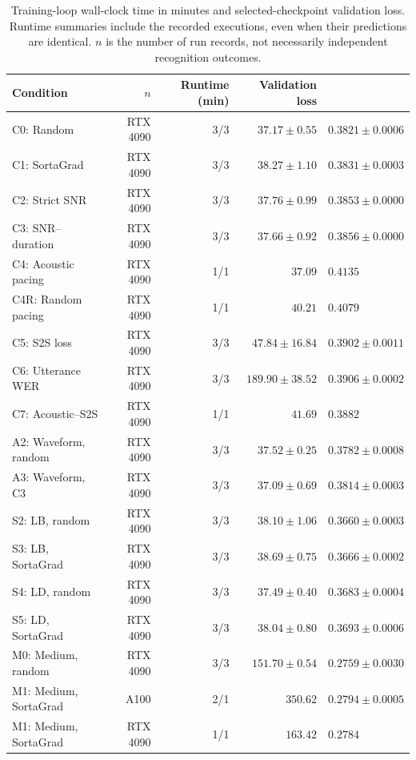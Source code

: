 \documentclass[12pt,a4paper]{report}
\begin{document}
\begin{table}[htbp]\centering\small
\caption{Training-loop wall-clock time in minutes and selected-checkpoint validation loss. Runtime summaries include the recorded executions, even when their predictions are identical. $n$ is the number of run records, not necessarily independent recognition outcomes.}\label{tab:results-resources}
\begin{tabular}{lrrr}\toprule
Condition & $n$ & Runtime (min) & Validation loss\\\midrule
C0: Random & RTX 4090 & 3/3 & $37.17 \pm 0.55$ & $0.3821 \pm 0.0006$ \\
C1: SortaGrad & RTX 4090 & 3/3 & $38.27 \pm 1.10$ & $0.3831 \pm 0.0003$ \\
C2: Strict SNR & RTX 4090 & 3/3 & $37.76 \pm 0.99$ & $0.3853 \pm 0.0000$ \\
C3: SNR--duration & RTX 4090 & 3/3 & $37.66 \pm 0.92$ & $0.3856 \pm 0.0000$ \\
C4: Acoustic pacing & RTX 4090 & 1/1 & $37.09$ & $0.4135$ \\
C4R: Random pacing & RTX 4090 & 1/1 & $40.21$ & $0.4079$ \\
C5: S2S loss & RTX 4090 & 3/3 & $47.84 \pm 16.84$ & $0.3902 \pm 0.0011$ \\
C6: Utterance WER & RTX 4090 & 3/3 & $189.90 \pm 38.52$ & $0.3906 \pm 0.0002$ \\
C7: Acoustic--S2S & RTX 4090 & 1/1 & $41.69$ & $0.3882$ \\
A2: Waveform, random & RTX 4090 & 3/3 & $37.52 \pm 0.25$ & $0.3782 \pm 0.0008$ \\
A3: Waveform, C3 & RTX 4090 & 3/3 & $37.09 \pm 0.69$ & $0.3814 \pm 0.0003$ \\
S2: LB, random & RTX 4090 & 3/3 & $38.10 \pm 1.06$ & $0.3660 \pm 0.0003$ \\
S3: LB, SortaGrad & RTX 4090 & 3/3 & $38.69 \pm 0.75$ & $0.3666 \pm 0.0002$ \\
S4: LD, random & RTX 4090 & 3/3 & $37.49 \pm 0.40$ & $0.3683 \pm 0.0004$ \\
S5: LD, SortaGrad & RTX 4090 & 3/3 & $38.04 \pm 0.80$ & $0.3693 \pm 0.0006$ \\
M0: Medium, random & RTX 4090 & 3/3 & $151.70 \pm 0.54$ & $0.2759 \pm 0.0030$ \\
M1: Medium, SortaGrad & A100 & 2/1 & $350.62$ & $0.2794 \pm 0.0005$ \\
M1: Medium, SortaGrad & RTX 4090 & 1/1 & $163.42$ & $0.2784$ \\

\end{tabular}
\end{table}
\end{document}
